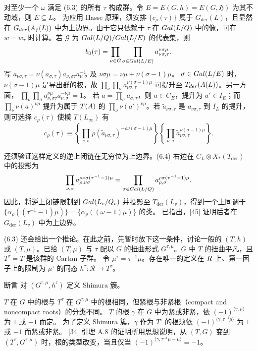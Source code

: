 对至少一个 $\omega$ 满足 (6.3) 的所有 $\tau$ 构成群。令
$E=E(G,h)=E(G,\mathfrak H)$ 为其不动域，则 $E\subseteq L$。
为应用 Hasse 原理，须安排 $\{c_\rho(\tau)\}$ 属于 $G_{\mathrm{der}}(L)$，且显然在
$G_{der}(A_f(L))$ 中为上边界。由于它只依赖于 $\tau$ 在
$Gal(L/Q)$ 中的像，可在 $w=w_\tau$ 时计算。若 $\mathcal G$ 为
$Gal(L/Q)/Gal(L/E)$ 的代表集，则
\[
b_0(\tau)=\prod_{\nu\in G}\prod_{\sigma\in Gal(L/E)}
a_{\nu\sigma,\tau}^{\nu\sigma\mu}.
\]
写 $a_{\nu\sigma,\tau}=\nu(a_{\sigma,\tau})a_{\nu,\sigma\tau}a_{\nu,\sigma}^{-1}$ 及
$\nu\sigma\mu=\nu\mu+\nu(\sigma-1)\mu$。
$\sigma\in Gal(L/E)$ 时，$\nu(\sigma-1)\mu$ 是导出群的权，故
$\prod_\nu\prod_\sigma a_{\nu\sigma,\tau}^{\nu(\sigma-1)\mu}$ 可提升至
$T_{der}(A(L))$。另一方面，
$\prod_\nu\prod_\sigma a_{\nu,\sigma\tau}^{\nu\mu}a_{\nu,\sigma}^{-\nu\mu}=1$。
若 $a=\prod_\sigma a_{\sigma,\tau}$，则 $a\in C_E$，提升为 $a'\in I_E$；而
$\prod_\nu\nu(a)^{\nu\mu}$ 提升为属于 $T(A)$ 的
$\prod_\nu\nu(a')^{\nu\mu}$。若 $\widetilde a_{\nu\sigma,\tau}$ 是
$a_{\nu\sigma,\tau}$ 到 $I_L$ 的提升，则可选择 $c_\rho(\tau)$ 使模
$T(L_\infty)$ 有
\begin{equation}
c_\rho(\tau)\equiv
\left\{\prod_{\nu,\sigma}\rho(\widetilde a_{\nu\sigma,\tau})^{-\rho\nu(\sigma-1)\mu}\right\}
\left\{\prod_{\nu,\sigma}\widetilde a_{\nu\sigma,\tau}^{\nu(\sigma-1)\mu}\right\}.
\tag{6.4}
\end{equation}

还须验证这样定义的逆上闭链在无穷位为上边界。(6.4) 右边在
$C_L\otimes X_*(T_{\mathrm{der}})$ 中的投影为
\[
\prod_{\nu,\sigma}a_{\rho,\nu\sigma}^{\rho\nu\sigma(\tau^{-1}-1)\mu}
=\prod_{\sigma\in Gal(L/Q)}a_{\rho,\sigma}^{\rho\sigma(\tau^{-1}-1)\mu}.
\]
因此，将逆上闭链限制到 $Gal(L_v/Q_v)$ 并投影至 $T_{\mathrm{der}}(L_v)$，得到一个上同调于
$\{\alpha_\rho((\tau^{-1}-1)\mu)\}=\{\alpha_\rho((\omega-1)\mu)\}$ 的类。
已指出，[45] 证明后者在 $G_{\mathrm{der}}(L_v)$ 中为上边界。

(6.3) 还会给出一个推论。在此之前，先暂时放下这一条件，讨论一般的 $(T,h)$ 或 $(T,\mu)$。已给 $(T,\mu)$ 与 $\tau$ 配以 $G$ 的扭曲形式
$G^{\tau,\mu}$。$G$ 中 $T$ 的扭曲平凡，且 $T^\tau=T$ 是该群的 Cartan 子群。
令 $\mu^\tau=\tau^{-1}\mu$。存在唯一的定义在 $R$ 上、第一因子上的限制为
$\mu^\tau$ 的同态 $h^\tau:\mathcal R\to T^\tau$。

\begin{originaltheorem}{断言}
对 $(G^{\tau,\mu},h^\tau)$ 定义 Shimura 簇。
\end{originaltheorem}
$T$ 在 $G$ 中的根与 $T^\tau$ 在 $G^{\tau,\mu}$ 中的根相同，但紧根与非紧根（compact and noncompact roots）的分类不同。
$T$ 的根 $\gamma$ 在 $G$ 中为紧或非紧，依
$(-1)^{\langle\gamma,\mu\rangle}$ 为 $1$ 或 $-1$ 而定。
为了定义 Shimura 簇，$\gamma$ 作为 $T^\tau$ 的根须依
$(-1)^{\langle\gamma,\tau^{-1}\mu\rangle}$ 为 $1$ 或 $-1$ 而紧或非紧。
[34] 引理 A.8 的证明所用思想说明，从 $(T,G)$ 变到 $(T^\tau,G^{\tau,\mu})$ 时，根的类型改变，当且仅当
$(-1)^{\langle\gamma,\tau^{-1}\mu-\mu\rangle}=-1$。

